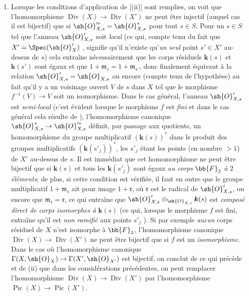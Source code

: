 \begin{remarks}[21.8.6]
\begin{enumerate}[label=(\roman*)]
  \item Lorsque les conditions d'application de [(ii)] sont remplies, on voit que l'homomorphisme $\operatorname{Div}(X)\to\operatorname{Div}(X')$ ne peut être injectif (auquel cas il est bijectif) que si $\sh{O}'^{*}_{X,s}=\sh{O}^*_{X,s}$ pour tout $s\in S$.
Pour un $s\in S$ tel que l'anneau $\sh{O}'_{X,s}$ soit \emph{local} (ce qui, compte tenu du fait que $X'=\Spec(\sh{O}'_X)$ , signifie qu'il n'existe qu'\emph{un seul} point $s'\in X'$ au-dessus de $s$) cela entraîne nécessairement que les corps résiduels $\boldsymbol{k}(s)$ et $\boldsymbol{k}(s')$ sont égaux et que $1+\mathfrak{m}_s=1+\mathfrak{m}_{s'}$, donc finalement équivaut à la relation $\sh{O}'_{X,s}=\sh{O}_{X,s}$ ou encore (compte tenu de l'hypothèse) au fait qu'il y a un voisinage ouvert $V$ de $s$ dans $X$ tel que le morphisme $f^{-1}(V)\to V$ soit un isomorphisme.
Dans le cas général, l'anneau $\sh{O}'_{X,s}$ est \emph{semi-local} (c'est évident lorsque le morphisme $f$ est \emph{fini} et dans le cas général cela résulte de ), l'homomorphisme canonique $\sh{O}^{*}_{X,s}\to\sh{O}'^{*}_{X,s}$ définit, par passage aux quotients, un homomorphisme du groupe multiplicatif $(\boldsymbol{k}(s))^*$ dans le produit des groupes multiplicatifs $(\boldsymbol{k}(s'_j))^*$, les $s'_j$ étant les points (en
nombre $>1$) de $X'$ au-dessus de $s$.
Il est immédiat que cet homomorphisme ne peut être bijectif que si $\boldsymbol{k}(s)$ et tous les $\boldsymbol{k}(s'_j)$ sont égaux \emph{au corps} $\bb{F}_2$ \emph{à $2$ éléments};
de plus, si cette condition est vérifiée, il faut en outre que le groupe multiplicatif $1+\mathfrak{m}_s$ ait pour image $1+\mathfrak{r}$, où $\mathfrak{r}$ est le radical de $\sh{O}'_{X,s}$, ou encore que $\mathfrak{m}_s=\mathfrak{r}$, ce qui entraîne que $\sh{O}'_{X,s}\otimes_{\sh{O}_{X,s}}\boldsymbol{k}(s)$ est \emph{composé direct de corps isomorphes à} $\boldsymbol{k}(s)$ (ce qui, lorsque le morphisme $f$ est fini, entraîne qu'il est \emph{non ramifié} aux points $s'_j$ ).
Si par exemple \emph{aucun} corps résiduel de $X$ n'est isomorphe à $\bb{F}_2$, l'homomorphisme canonique $\operatorname{Div}(X)\to\operatorname{Div}(X')$ ne peut être bijectif que si $f$ est un \emph{isomorphisme}.
Dans le cas où l'homomorphisme canonique $\Gamma(X,\sh{O}_X)\to\Gamma(X',\sh{O}_{X'})$ est bijectif, on conclut de ce qui précède et de (ii) que dans les considérations précédentes, on peut remplacer l'homomorphisme $\operatorname{Div}(X)\to\operatorname{Div}(X')$ par l'homomorphisme $\operatorname{Pic}(X)\to\operatorname{Pic}(X')$.
\end{enumerate}
\end{remarks}

